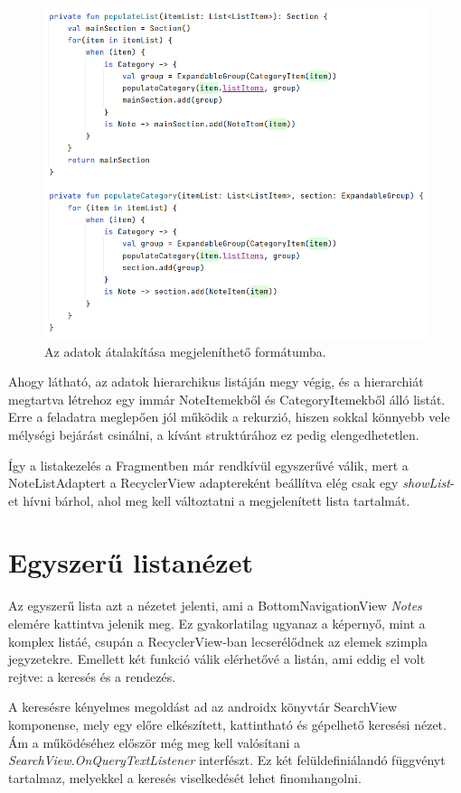 \begin{figure}[!ht]
	\centering
	\includegraphics[width=145mm, keepaspectratio]{figures/list_population.png}
	\caption{Az adatok átalakítása megjeleníthető formátumba.}
	\label{fig:PopulateList}
\end{figure}

Ahogy látható, az adatok hierarchikus listáján megy végig, és a hierarchiát megtartva létrehoz egy immár NoteItemekből és CategoryItemekből álló listát. Erre a feladatra meglepően jól működik a rekurzió, hiszen sokkal könnyebb vele mélységi bejárást csinálni, a kívánt struktúrához ez pedig elengedhetetlen. 

Így a listakezelés a Fragmentben már rendkívül egyszerűvé válik, mert a NoteListAdaptert a RecyclerView adaptereként beállítva elég csak egy \emph{showList}-et hívni bárhol, ahol meg kell változtatni a megjelenített lista tartalmát. 

\section{Egyszerű listanézet}
Az egyszerű lista azt a nézetet jelenti, ami a BottomNavigationView \emph{Notes} elemére kattintva jelenik meg. Ez gyakorlatilag ugyanaz a képernyő, mint a komplex listáé, csupán a RecyclerView-ban lecserélődnek az elemek szimpla jegyzetekre. Emellett két funkció válik elérhetővé a listán, ami eddig el volt rejtve: a keresés és a rendezés. 

A keresésre kényelmes megoldást ad az androidx könyvtár SearchView komponense, mely egy előre elkészített, kattintható és gépelhető keresési nézet. Ám a működéséhez először még meg kell valósítani a \emph{SearchView.OnQueryTextListener} interfészt. Ez két felüldefiniálandó függvényt tartalmaz, melyekkel a keresés viselkedését lehet finomhangolni. 

